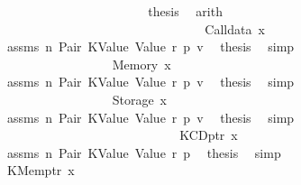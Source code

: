 \begin{isabellebody}
\ \ \ \ \ \ \ \ \ \ \ \ \ \ \ \ \ \ \ \ \isamarkupfalse%
\ \isamarkupfalse%
\ {\isacharquery}{\kern0pt}thesis\ \isamarkupfalse%
\ arith\isanewline
\ \ \ \ \ \ \ \ \ \ \ \ \ \ \ \ \ \ \isamarkupfalse%
\isanewline
\ \ \ \ \ \ \ \ \ \ \ \ \ \ \ \ \isamarkupfalse%
\isanewline
\ \ \ \ \ \ \ \ \ \ \ \ \ \ \isamarkupfalse%
\isanewline
\ \ \ \ \ \ \ \ \ \ \ \ \ \ \ \ \isamarkupfalse%
\ {\isacharparenleft}{\kern0pt}Calldata\ x{}{\isacharparenright}{\kern0pt}\isanewline
\ \ \ \ \ \ \ \ \ \ \ \ \ \ \ \ \isamarkupfalse%
\ assms\ n\ Pair\ KValue\ Value\ r{}\ p{}\ v{}\ \isamarkupfalse%
\ {\isacharquery}{\kern0pt}thesis\ \isamarkupfalse%
\ simp\isanewline
\ \ \ \ \ \ \ \ \ \ \ \ \ \ \isamarkupfalse%
\isanewline
\ \ \ \ \ \ \ \ \ \ \ \ \ \ \ \ \isamarkupfalse%
\ {\isacharparenleft}{\kern0pt}Memory\ x{}{\isacharparenright}{\kern0pt}\isanewline
\ \ \ \ \ \ \ \ \ \ \ \ \ \ \ \ \isamarkupfalse%
\ assms\ n\ Pair\ KValue\ Value\ r{}\ p{}\ v{}\ \isamarkupfalse%
\ {\isacharquery}{\kern0pt}thesis\ \isamarkupfalse%
\ simp\isanewline
\ \ \ \ \ \ \ \ \ \ \ \ \ \ \isamarkupfalse%
\isanewline
\ \ \ \ \ \ \ \ \ \ \ \ \ \ \ \ \isamarkupfalse%
\ {\isacharparenleft}{\kern0pt}Storage\ x{}{\isacharparenright}{\kern0pt}\isanewline
\ \ \ \ \ \ \ \ \ \ \ \ \ \ \ \ \isamarkupfalse%
\ assms\ n\ Pair\ KValue\ Value\ r{}\ p{}\ v{}\ \isamarkupfalse%
\ {\isacharquery}{\kern0pt}thesis\ \isamarkupfalse%
\ simp\isanewline
\ \ \ \ \ \ \ \ \ \ \ \ \ \ \isamarkupfalse%
\isanewline
\ \ \ \ \ \ \ \ \ \ \ \ \isamarkupfalse%
\isanewline
\ \ \ \ \ \ \ \ \ \ \ \ \ \ \isamarkupfalse%
\ {\isacharparenleft}{\kern0pt}KCDptr\ x{}{\isacharparenright}{\kern0pt}\isanewline
\ \ \ \ \ \ \ \ \ \ \ \ \ \ \isamarkupfalse%
\ assms\ n\ Pair\ KValue\ Value\ r{}\ p{}\ \isamarkupfalse%
\ {\isacharquery}{\kern0pt}thesis\ \isamarkupfalse%
\ simp\isanewline
\ \ \ \ \ \ \ \ \ \ \ \ \isamarkupfalse%
\isanewline
\ \ \ \ \ \ \ \ \ \ \ \ \ \ \isamarkupfalse%
\ {\isacharparenleft}{\kern0pt}KMemptr\ x{}{\isacharparenright}{\kern0pt}\isanewline

\end{isabellebody}
